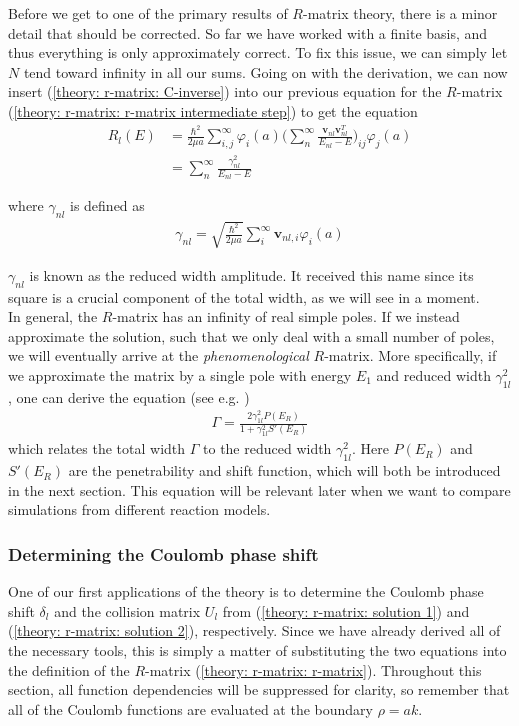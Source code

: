 Before we get to one of the primary results of $R$-matrix theory, there is a minor detail that should be corrected. So far we have worked with a finite basis, and thus everything is only approximately correct. To fix this issue, we can simply let $N$ tend toward infinity in all our sums. Going on with the derivation, we can now insert (\ref{theory: r-matrix: C-inverse}) into our previous equation for the $R$-matrix (\ref{theory: r-matrix: r-matrix intermediate step}) to get the equation
\begin{align*}
	R_l(E) &= \frac{\hbar^2}{2\mu a} \sum_{i, j}^{\infty} \varphi_i(a)\bigg(\sum_n^\infty \frac{\bm{v}_{nl}\bm{v}_{nl}^T}{E_{nl} - E}\bigg)_{ij}\varphi_j(a) \\
	&= \sum_{n}^{\infty} \frac{\gamma^2_{nl}}{E_{nl} - E}
\end{align*}

where $\gamma_{nl}$ is defined as 
\begin{align} \label{theory: r-matrix: reduced width}
	\gamma_{nl} = \sqrt{\frac{\hbar^2}{2\mu a}} \sum_{i}^{\infty}\bm{v}_{nl, i}\varphi_i(a)
\end{align}

$\gamma_{nl}$ is known as the reduced width amplitude. It received this name since its square is a crucial component of the total width, as we will see in a moment.\\

In general, the $R$-matrix has an infinity of real simple poles. If we instead approximate the solution, such that we only deal with a small number of poles, we will eventually arrive at the \textit{phenomenological} $R$-matrix. More specifically, if we approximate the matrix by a single pole with energy $E_1$ and reduced width $\gamma_{1l}^2$, one can derive the equation (see e.g. \cite{Baye})
\begin{align} \label{theory: r-matrix: Gamma gamma}
	\Gamma = \frac{2 \gamma_{1l}^2 P(E_R)}{1 + \gamma_{1l}^2 S'(E_R)}
\end{align}
which relates the total width $\Gamma$ to the reduced width $\gamma_{1l}^2$. Here $P(E_R)$ and $S'(E_R)$ are the penetrability and shift function, which will both be introduced in the next section. This equation will be relevant later when we want to compare simulations from different reaction models. 

\subsubsection{Determining the Coulomb phase shift} \label{sec: theory: r-matrix: applications}
One of our first applications of the theory is to determine the Coulomb phase shift $\delta_l$ and the collision matrix $U_l$ from (\ref{theory: r-matrix: solution 1}) and (\ref{theory: r-matrix: solution 2}), respectively. Since we have already derived all of the necessary tools, this is simply a matter of substituting the two equations into the definition of the $R$-matrix (\ref{theory: r-matrix: r-matrix}). Throughout this section, all function dependencies will be suppressed for clarity, so remember that all of the Coulomb functions are evaluated at the boundary $\rho = ak$. \\

